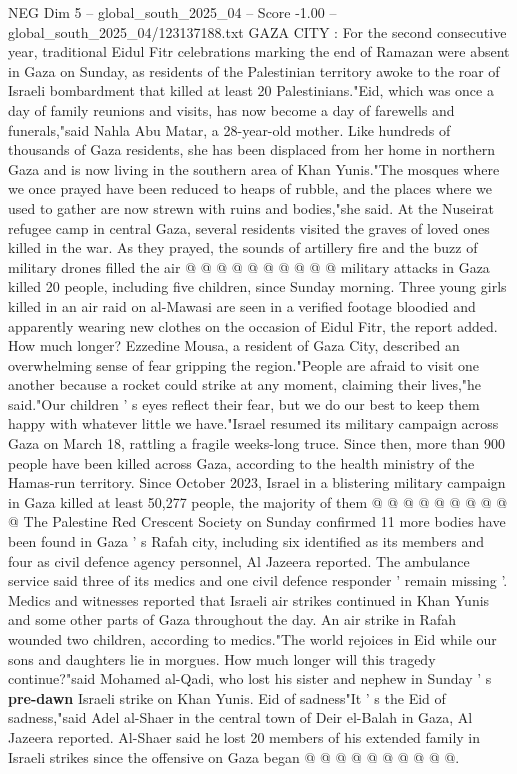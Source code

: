 \begin{textsample}{NEG Dim 5 – global\_south\_2025\_04 – Score -1.00 – global\_south\_2025\_04/123137188.txt}  \label{ex:f5_neg_364}
GAZA CITY : For the second consecutive year, traditional Eidul Fitr celebrations marking the end of Ramazan were absent in Gaza on Sunday, as residents of the Palestinian territory awoke to the roar of Israeli bombardment that killed at least 20 Palestinians."Eid, which was once a day of family reunions and visits, has now become a day of farewells and funerals,"said Nahla Abu Matar, a 28-year-old mother.
Like hundreds of thousands of Gaza residents, she has been displaced from her home in northern Gaza and is now living in the southern area of Khan Yunis."The mosques where we once prayed have been reduced to heaps of rubble, and the places where we used to gather are now strewn with ruins and bodies,"she said.
At the Nuseirat refugee camp in central Gaza, several residents visited the graves of loved ones killed in the war.
As they prayed, the sounds of artillery fire and the buzz of military drones filled the air @ @ @ @ @ @ @ @ @ @ military attacks in Gaza killed 20 people, including five children, since Sunday morning.
Three young girls killed in an air raid on al-Mawasi are seen in a verified footage bloodied and apparently wearing new clothes on the occasion of Eidul Fitr, the report added.
How much longer?
Ezzedine Mousa, a resident of Gaza City, described an overwhelming sense of fear gripping the region."People are afraid to visit one another because a rocket could strike at any moment, claiming their lives,"he said."Our children ' s eyes reflect their fear, but we do our best to keep them happy with whatever little we have."Israel resumed its military campaign across Gaza on March 18, rattling a fragile weeks-long truce.
Since then, more than 900 people have been killed across Gaza, according to the health ministry of the Hamas-run territory.
Since October 2023, Israel in a blistering military campaign in Gaza killed at least 50,277 people, the majority of them @ @ @ @ @ @ @ @ @ @ The Palestine Red Crescent Society on Sunday confirmed 11 more bodies have been found in Gaza ' s Rafah city, including six identified as its members and four as civil defence agency personnel, Al Jazeera reported.
The ambulance service said three of its medics and one civil defence responder ' remain missing '.
Medics and witnesses reported that Israeli air strikes continued in Khan Yunis and some other parts of Gaza throughout the day.
An air strike in Rafah wounded two children, according to medics."The world rejoices in Eid while our sons and daughters lie in morgues.
How much longer will this tragedy continue?"said Mohamed al-Qadi, who lost his sister and nephew in Sunday ' s \textbf{pre-dawn} Israeli strike on Khan Yunis.
Eid of sadness"It ' s the Eid of sadness,"said Adel al-Shaer in the central town of Deir el-Balah in Gaza, Al Jazeera reported.
Al-Shaer said he lost 20 members of his extended family in Israeli strikes since the offensive on Gaza began @ @ @ @ @ @ @ @ @ @.

\end{textsample}

